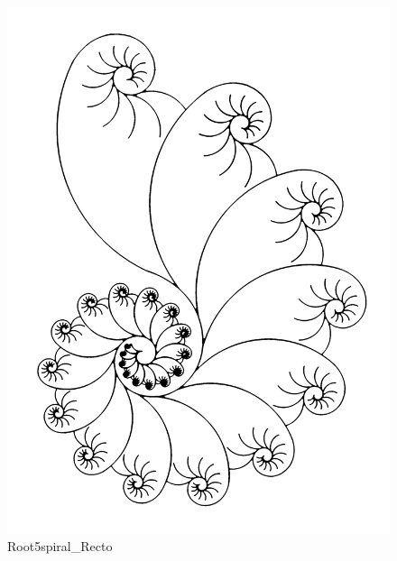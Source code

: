 \begin{Shaded}
\begin{Highlighting}[]
\OperatorTok{\textgreater{}\textgreater{}\textgreater{}}\NormalTok{ \{}
\NormalTok{\{}\NormalTok{: }\NormalTok{, }\NormalTok{: }\NormalTok{, }\NormalTok{: }\NormalTok{, }
\NormalTok{: }\NormalTok{\}}
\end{Highlighting}
\end{Shaded}

\begin{figure}
\centering
\includegraphics{images/Root5spiral_Recto.png}
\caption{Root5spiral\_Recto}
\end{figure}

